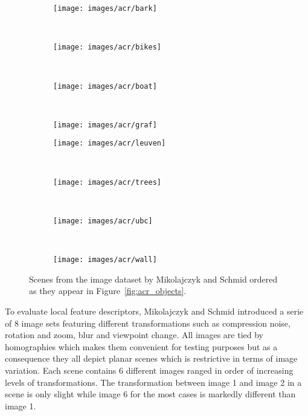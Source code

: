 \documentclass[journal]{IEEEtran}
\begin{document}
\begin{figure}[t]
    \begin{subfigure}[t]{0.24\columnwidth}
        \centering
        \texttt{[image: images/acr/bark]}
    \end{subfigure}%
    ~ %
    \begin{subfigure}[t]{0.24\columnwidth}
        \centering
        \texttt{[image: images/acr/bikes]}
    \end{subfigure}%
    ~ %
    \begin{subfigure}[t]{0.24\columnwidth}
        \centering
        \texttt{[image: images/acr/boat]}
    \end{subfigure}%
    ~ %
    \begin{subfigure}[t]{0.24\columnwidth}
        \centering
        \texttt{[image: images/acr/graf]}
    \end{subfigure}%
    \vspace{1.5 mm}
    \begin{subfigure}[t]{0.24\columnwidth}
        \centering
        \texttt{[image: images/acr/leuven]}
    \end{subfigure}%
    ~ %
    \begin{subfigure}[t]{0.24\columnwidth}
        \centering
        \texttt{[image: images/acr/trees]}
    \end{subfigure}%
    ~ %
    \begin{subfigure}[t]{0.24\columnwidth}
        \centering
        \texttt{[image: images/acr/ubc]}
    \end{subfigure}%
    ~ %
    \begin{subfigure}[t]{0.24\columnwidth}
        \centering
        \texttt{[image: images/acr/wall]}
    \end{subfigure}%
    \caption{Scenes from the image dataset by Mikolajczyk and Schmid 
    \cite{mikolajczyk2005performance} ordered as they appear in 
Figure~\ref{fig:acr_objects}.}
    \label{fig:acr_images}
\end{figure}

To evaluate local feature descriptors, Mikolajczyk and Schmid introduced
a serie of $8$ image sets featuring different transformations such as 
compression noise, rotation and zoom, blur and viewpoint change. All 
images are tied by homographies which makes them convenient for testing 
purposes but as a consequence they all depict planar scenes which is 
restrictive in terms of image variation. Each scene contains 6 different 
images ranged in order of increasing levels of transformations. The 
transformation between image 1 and image 2 in a scene is only slight 
while image 6 for the most cases is markedly different than image 1.
\end{document}
